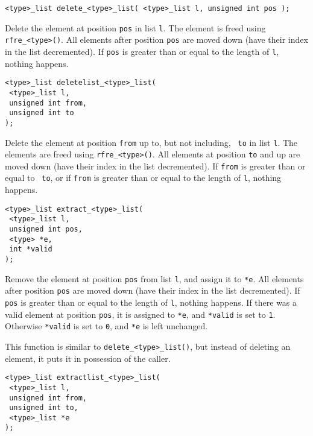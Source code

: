 \begin{verbatim}
<type>_list delete_<type>_list( <type>_list l, unsigned int pos );
\end{verbatim}
\begin{desc}
Delete the element at position \texttt{pos} in list \texttt{l}.
The element is freed using \texttt{rfre\_<type>()}.
All elements after position \texttt{pos} are moved down
(have their index in the list decremented).
If \texttt{pos} is greater than or equal to the length of \texttt{l},
nothing happens.
\end{desc}
\begin{verbatim}
<type>_list deletelist_<type>_list(
 <type>_list l,
 unsigned int from,
 unsigned int to
);
\end{verbatim}
\begin{desc}
Delete the element at position \texttt{from} up to, but not including, {\tt
to} in list \texttt{l}.  The elements are freed using \texttt{rfre\_<type>()}.
All elements at position \texttt{to} and up are moved down (have their index
in the list decremented).  If \texttt{from} is greater than or equal to {\tt
to}, or if \texttt{from} is greater than or equal to the length of \texttt{l},
nothing happens.
\end{desc}
\begin{verbatim}
<type>_list extract_<type>_list(
 <type>_list l,
 unsigned int pos,
 <type> *e,
 int *valid
);
\end{verbatim}
\begin{desc}
Remove the element at position \texttt{pos} from list \texttt{l},
and assign it to \verb'*e'.
All elements after position \texttt{pos} are moved down
(have their index in the list decremented).
If \texttt{pos} is greater than or equal to the length of \texttt{l},
nothing happens.
If there was a valid element at position \texttt{pos}, it is assigned
to \verb'*e', and \verb'*valid' is set to \texttt{1}. Otherwise
\verb'*valid' is set to \texttt{0}, and \verb'*e' is left unchanged.
\par
This function is similar to \verb'delete_<type>_list()', but instead
of deleting an element, it puts it in possession of the caller.
\end{desc}
\begin{verbatim}
<type>_list extractlist_<type>_list(
 <type>_list l,
 unsigned int from,
 unsigned int to,
 <type>_list *e
);
\end{verbatim}

